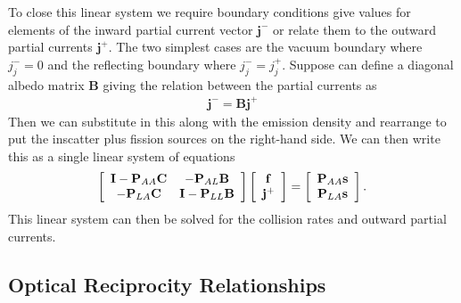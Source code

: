 To close this linear system we require boundary conditions give values for elements of the inward partial current vector $\mathbf{j}^-$ or relate them to the outward partial currents $\mathbf{j}^+$. The two simplest cases are the vacuum boundary where $j_j^- = 0$ and the reflecting boundary where $j_j^- = j_j^+$. Suppose can define a diagonal albedo matrix $\mathbf{B}$ giving the relation between the partial currents as
\begin{align}
  \mathbf{j}^- = \mathbf{B j}^+
\end{align}
Then we can substitute in this along with the emission density and rearrange to put the inscatter plus fission sources on the right-hand side. We can then write this as a single linear system of equations
\begin{align} \label{Eq:transport_collisionProbabilityMethod2D_matrixVectorEquations}
  \left[ \begin{array}{c c}
  \mathbf{I} - \mathbf{P}_{AA} \mathbf{C} 	& - \mathbf{P}_{AL} \mathbf{B} \\
  -\mathbf{P}_{LA} \mathbf{C}				& \mathbf{I} - \mathbf{P}_{LL} \mathbf{B} \\ \end{array} \right]
  \left[ \begin{array}{c} \mathbf{f} \\ \mathbf{j}^+ \\ \end{array} \right] =
  \left[ \begin{array}{c} \mathbf{P}_{AA} \mathbf{s} \\ \mathbf{P}_{LA} \mathbf{s} \\ \end{array} \right] .
\end{align}
This linear system can then be solved for the collision rates and outward partial currents.





\subsection{Optical Reciprocity Relationships}

